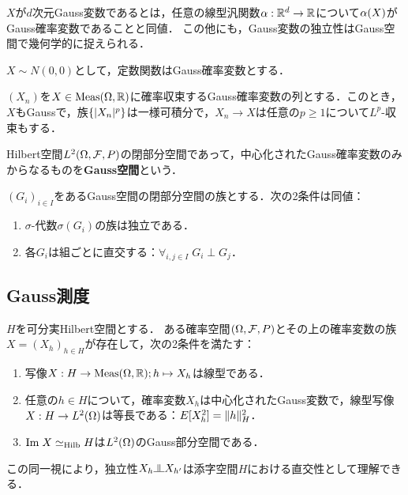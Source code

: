\documentclass[uplatex,dvipdfmx]{jsreport}
\begin{document}
\begin{tcolorbox}[colframe=ForestGreen, colback=ForestGreen!10!white,breakable,colbacktitle=ForestGreen!40!white,coltitle=black,fonttitle=\bfseries\sffamily,
title=]
    $X$が$d$次元Gauss変数であるとは，任意の線型汎関数$\alpha:\mathbb{R}^d\to\mathbb{R}$について$\alpha(X)$がGauss確率変数であることと同値．
    この他にも，Gauss変数の独立性はGauss空間で幾何学的に捉えられる．
\end{tcolorbox}

\begin{notation}
    $X\sim N(0,0)$として，定数関数はGauss確率変数とする．
\end{notation}

\begin{proposition}[Gauss確率変数全体の空間は閉部分空間をなす]
    $(X_n)$を$X\in\mathrm{Meas}(\Omega,\mathbb{R})$に確率収束するGauss確率変数の列とする．このとき，$X$もGaussで，族$\{\lvert X_n\rvert^p\}$は一様可積分で，$X_n\to X$は任意の$p\ge1$について$L^p$-収束もする．
\end{proposition}

\begin{definition}
    Hilbert空間$L^2(\Omega,\mathcal{F},P)$の閉部分空間であって，中心化されたGauss確率変数のみからなるものを\textbf{Gauss空間}という．
\end{definition}

\begin{proposition}[独立性の特徴付け]
    $(G_i)_{i\in I}$をあるGauss空間の閉部分空間の族とする．次の2条件は同値：
    \begin{enumerate}
        \item $\sigma$-代数$\sigma(G_i)$の族は独立である．
        \item 各$G_i$は組ごとに直交する：$\forall_{i,j\in I}\;G_i\perp G_j$．
    \end{enumerate}
\end{proposition}

\subsection{Gauss測度}

\begin{proposition}[一般化された独立同分布列の存在定理]
    $H$を可分実Hilbert空間とする．
    ある確率空間$(\Omega,\mathcal{F},P)$とその上の確率変数の族$X=(X_h)_{h\in H}$が存在して，次の2条件を満たす：
    \begin{enumerate}
        \item 写像$X:H\to\mathrm{Meas}(\Omega,\mathbb{R});h\mapsto X_h$は線型である．
        \item 任意の$h\in H$について，確率変数$X_h$は中心化されたGauss変数で，線型写像$X:H\to L^2(\Omega)$は等長である：$E[X_h^2]=\|h\|^2_H$．
        \item $\mathrm{Im}\; X\simeq_{\mathrm{Hilb}} H$は$L^2(\Omega)$のGauss部分空間である．
    \end{enumerate}
\end{proposition}
\begin{remark}
    この同一視により，独立性$X_h\indep X_{h'}$は添字空間$H$における直交性として理解できる．
\end{remark}
\end{document}
